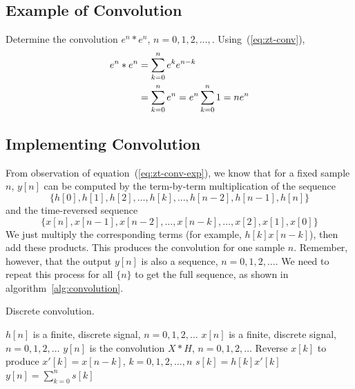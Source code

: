 \subsection{Example of Convolution}

Determine the convolution $e^n \ast e^n$, $n=0,1,2,\ldots,
$. Using~(\ref{eq:zt-conv}),
\begin{align}
e^n \ast e^n &= \sum_{k=0}^{n}e^ke^{n-k} \notag\\
             &= \sum_{k=0}^{n}e^n=e^n\sum_{k=0}^{n}1=ne^n
\end{align}


\subsection{Implementing Convolution}

From observation of equation~(\ref{eq:zt-conv-exp}), we know that for
a fixed sample $n$, $y[n]$ can be computed by the term-by-term
multiplication of the sequence
\begin{equation}
\{h[0], h[1], h[2], \ldots, h[k], \ldots, h[n-2], h[n-1], h[n]\}
\end{equation}
and the time-reversed sequence
\begin{equation}
\{x[n], x[n-1], x[n-2], \ldots, x[n-k] , \ldots, x[2], x[1], x[0]\}
\end{equation}
We just multiply the corresponding terms (for example, $h[k]x[n-k]$),
then add these products. This produces the convolution for one sample
$n$.  Remember, however, that the output $y[n]$ is also a sequence,
$n=0,1,2,\ldots$. We need to repeat this process for all $\{n\}$ to
get the full sequence, as shown in algorithm~\ref{alg:convolution}.
 
\begin{algorithm}
\caption{Discrete convolution.\label{alg:convolution}}
\begin{algorithmic}
\REQUIRE $h[n]$ is a finite, discrete signal, $n = 0, 1, 2, \ldots$
\REQUIRE $x[n]$ is a finite, discrete signal, $n = 0, 1, 2, \ldots$
\ENSURE $y[n]$ is the convolution $X * H$, $n = 0, 1, 2, \ldots$
   \STATE Reverse $x[k]$ to produce $x'[k] = x[n-k]$, $k = 0, 1, 2,
          \ldots, n$
   \STATE $s[k] = h[k] x'[k]$
   \STATE $y[n] = \sum_{k=0}^n s[k]$
\ENDFOR
\end{algorithmic}
\end{algorithm}

